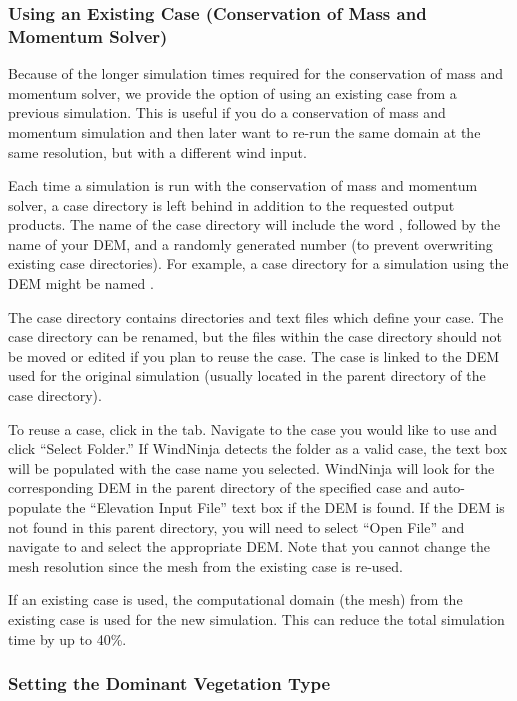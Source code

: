 \documentclass[12pt]{article}
\begin{document}
\subsubsection{Using an Existing Case (Conservation of Mass and Momentum Solver)}

Because of the longer simulation times required for the conservation of mass and momentum solver, we provide the option of using an existing case from a previous simulation. This is useful if you do a conservation of mass and momentum simulation and then later want to re-run the same domain at the same resolution, but with a different wind input.

Each time a simulation is run with the conservation of mass and momentum solver, a case directory is left behind in addition to the requested output products.  The name of the case directory will include the word , followed by the name of  your DEM, and a randomly generated number (to prevent overwriting existing case directories). 
For example, a case directory for a simulation using the DEM might be named .

The case directory contains directories and text files which define your case. The case directory can be renamed, but the files within the case directory should not be moved or edited if you plan to reuse the case. The case is linked to the DEM used for the original simulation (usually located in the parent directory of the case directory).

To reuse a case, click  in the  tab. Navigate to the case you would like to use and click “Select Folder.” If WindNinja detects the folder as a valid case, the  text box will be populated with the case name you selected. WindNinja will look for the corresponding DEM in the parent directory of the specified case and auto-populate the “Elevation Input File” text box if the DEM is found. If the DEM is not found in this parent directory, you will need to select “Open File” and navigate to and select the appropriate DEM.  Note that you cannot change the mesh resolution since the mesh from the existing case is re-used.    

If an existing case is used, the computational domain (the mesh) from the existing case is used for the new simulation. This can reduce the total simulation time by up to 40\%.

\subsubsection{Setting the Dominant Vegetation Type}
\end{document}
